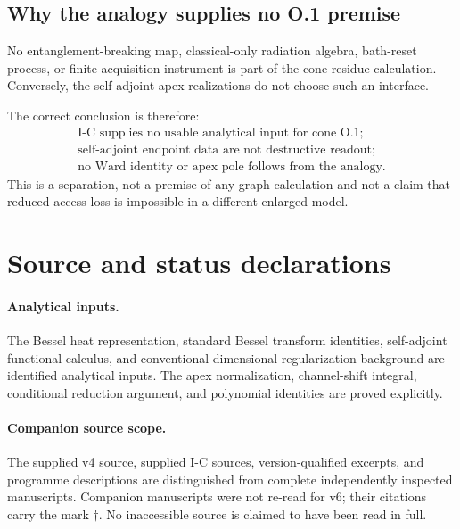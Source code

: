 \documentclass[11pt,a4paper]{article}
\theoremstyle{plain}
\theoremstyle{definition}
\theoremstyle{remark}
\numberwithin{equation}{section}
\begin{document}
\subsection{Why the analogy supplies no O.1 premise}

No entanglement-breaking map, classical-only radiation algebra,
bath-reset process, or finite acquisition instrument is part of
the cone residue calculation.
Conversely, the self-adjoint apex realizations do not choose such
an interface.

The correct conclusion is therefore:
\[
\boxed{
\begin{gathered}
\text{I-C supplies no usable analytical input for cone O.1;}\\
\text{self-adjoint endpoint data are not destructive readout;}\\
\text{no Ward identity or apex pole follows from the analogy.}
\end{gathered}}
\]
This is a separation, not a premise of any graph calculation
and not a claim that reduced access loss is impossible in a
different enlarged model.

\section{Source and status declarations}
\label{app:declarations}

\paragraph{Analytical inputs.}
The Bessel heat representation, standard Bessel transform identities,
self-adjoint functional calculus, and conventional dimensional
regularization background are identified analytical inputs.
The apex normalization, channel-shift integral, conditional reduction
argument, and polynomial identities are proved explicitly.

\paragraph{Companion source scope.}
The supplied v4 source, supplied I-C sources, version-qualified
excerpts, and programme descriptions are distinguished from
complete independently inspected manuscripts.
Companion manuscripts were not re-read for v6; their citations
carry the mark \(\dagger\).
No inaccessible source is claimed to have been read in full.
\end{document}
